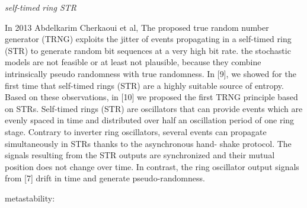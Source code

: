 \textit{self-timed ring STR}

In 2013 Abdelkarim Cherkaoui et al, The proposed true random number generator (TRNG) exploits the jitter of events propagating in a self-timed ring (STR) to generate random bit sequences at a very high bit rate. the stochastic models are not feasible or at least not plausible, because they combine intrinsically pseudo randomness with true randomness. 
In [9], we showed for the first time that self-timed rings (STR) are a highly suitable source of entropy. Based on these observations, in [10] we proposed the first TRNG principle based on STRs. Self-timed rings (STR) are oscillators that can provide events which are evenly spaced in time and distributed over half an oscillation period of one ring stage. Contrary to inverter ring oscillators, several events can propagate simultaneously in STRs thanks to the asynchronous hand- shake protocol. The signals resulting from the STR outputs are synchronized and their mutual position does not change over time. In contrast, the ring oscillator output signals from [7] drift in time and generate pseudo-randomness.

metastability: